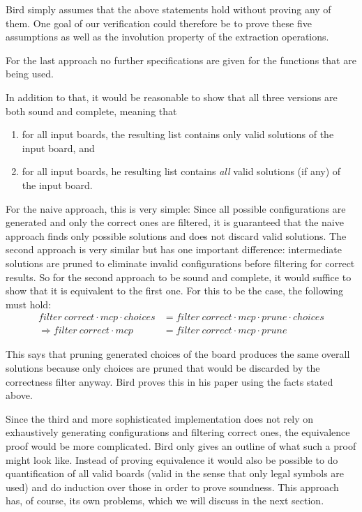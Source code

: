 \documentclass[a4paper,11pt]{article}
\begin{document}
Bird simply assumes that the above statements hold without proving any of them. One goal of our verification could therefore be to prove these five assumptions as well as the involution property of the extraction operations.

For the last approach no further specifications are given for the functions that are being used. 

In addition to that, it would be reasonable to show that all three versions are both sound and complete, meaning that
\begin{enumerate}
  \item for all input boards, the resulting list contains only valid solutions of the input board, and
  \item for all input boards, he resulting list contains \emph{all} valid solutions (if any) of the input board.
\end{enumerate}

For the naive approach, this is very simple: Since all possible configurations are generated and only the correct ones are filtered, it is guaranteed that the naive approach finds only possible solutions and does not discard valid solutions. The second approach is very similar but has one important difference: intermediate solutions are pruned to eliminate invalid configurations before filtering for correct results. So for the second approach to be sound and complete, it would suffice to show that it is equivalent to the first one. For this to be the case, the following must hold:
\begin{align*}
  filter~correct \cdot mcp \cdot choices &= filter~correct \cdot mcp \cdot prune \cdot choices\\
  \Rightarrow filter~correct \cdot mcp &= filter~correct \cdot mcp \cdot prune
\end{align*}

This says that pruning generated choices of the board produces the same overall solutions because only choices are pruned that would be discarded by the correctness filter anyway. Bird proves this in his paper using the facts stated above.


Since the third and more sophisticated implementation does not rely on exhaustively generating configurations and filtering correct ones, the equivalence proof would be more complicated. Bird only gives an outline of what such a proof might look like. Instead of proving equivalence it would also be possible to do quantification of all valid boards (valid in the sense that only legal symbols are used) and do induction over those in order to prove soundness. This approach has, of course, its own problems, which we will discuss in the next section.
\end{document}

